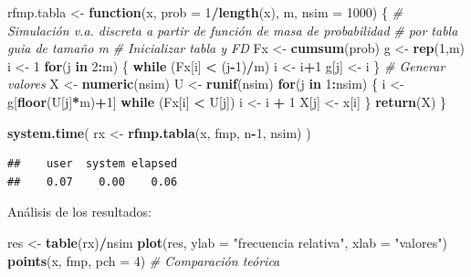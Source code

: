 \documentclass[]{book}
\newenvironment{Shaded}{\begin{snugshade}}{\end{snugshade}}
\newcommand{\KeywordTok}[1]{\textcolor[rgb]{0.13,0.29,0.53}{\textbf{#1}}}
\newcommand{\DataTypeTok}[1]{\textcolor[rgb]{0.13,0.29,0.53}{#1}}
\newcommand{\DecValTok}[1]{\textcolor[rgb]{0.00,0.00,0.81}{#1}}
\newcommand{\StringTok}[1]{\textcolor[rgb]{0.31,0.60,0.02}{#1}}
\newcommand{\CommentTok}[1]{\textcolor[rgb]{0.56,0.35,0.01}{\textit{#1}}}
\newcommand{\ControlFlowTok}[1]{\textcolor[rgb]{0.13,0.29,0.53}{\textbf{#1}}}
\newcommand{\OperatorTok}[1]{\textcolor[rgb]{0.81,0.36,0.00}{\textbf{#1}}}
\newcommand{\NormalTok}[1]{#1}
\theoremstyle{definition}
\theoremstyle{definition}
\theoremstyle{definition}
\theoremstyle{remark}
\begin{document}
\begin{Shaded}
\begin{Highlighting}[]
\NormalTok{rfmp.tabla <-}\StringTok{ }\ControlFlowTok{function}\NormalTok{(x, }\DataTypeTok{prob =} \DecValTok{1}\OperatorTok{/}\KeywordTok{length}\NormalTok{(x), m, }\DataTypeTok{nsim =} \DecValTok{1000}\NormalTok{) \{}
  \CommentTok{# Simulación v.a. discreta a partir de función de masa de probabilidad}
  \CommentTok{# por tabla guia de tamaño m}
  \CommentTok{# Inicializar tabla y FD}
\NormalTok{  Fx <-}\StringTok{ }\KeywordTok{cumsum}\NormalTok{(prob)}
\NormalTok{  g <-}\StringTok{ }\KeywordTok{rep}\NormalTok{(}\DecValTok{1}\NormalTok{,m)}
\NormalTok{  i <-}\StringTok{ }\DecValTok{1}
  \ControlFlowTok{for}\NormalTok{(j }\ControlFlowTok{in} \DecValTok{2}\OperatorTok{:}\NormalTok{m) \{}
    \ControlFlowTok{while}\NormalTok{ (Fx[i] }\OperatorTok{<}\StringTok{ }\NormalTok{(j}\OperatorTok{-}\DecValTok{1}\NormalTok{)}\OperatorTok{/}\NormalTok{m) i <-}\StringTok{ }\NormalTok{i}\OperatorTok{+}\DecValTok{1}
\NormalTok{    g[j] <-}\StringTok{ }\NormalTok{i}
\NormalTok{  \}}
  \CommentTok{# Generar valores}
\NormalTok{  X <-}\StringTok{ }\KeywordTok{numeric}\NormalTok{(nsim)}
\NormalTok{  U <-}\StringTok{ }\KeywordTok{runif}\NormalTok{(nsim)}
  \ControlFlowTok{for}\NormalTok{(j }\ControlFlowTok{in} \DecValTok{1}\OperatorTok{:}\NormalTok{nsim) \{}
\NormalTok{    i <-}\StringTok{ }\NormalTok{g[}\KeywordTok{floor}\NormalTok{(U[j]}\OperatorTok{*}\NormalTok{m)}\OperatorTok{+}\DecValTok{1}\NormalTok{]}
    \ControlFlowTok{while}\NormalTok{ (Fx[i] }\OperatorTok{<}\StringTok{ }\NormalTok{U[j]) i <-}\StringTok{ }\NormalTok{i }\OperatorTok{+}\StringTok{ }\DecValTok{1}
\NormalTok{    X[j] <-}\StringTok{ }\NormalTok{x[i]}
\NormalTok{  \}}
  \KeywordTok{return}\NormalTok{(X)}
\NormalTok{\}}

\KeywordTok{system.time}\NormalTok{( rx <-}\StringTok{ }\KeywordTok{rfmp.tabla}\NormalTok{(x, fmp, n}\OperatorTok{-}\DecValTok{1}\NormalTok{, nsim) )}
\end{Highlighting}
\end{Shaded}

\begin{verbatim}
##    user  system elapsed 
##    0.07    0.00    0.06
\end{verbatim}

Análisis de los resultados:

\begin{Shaded}
\begin{Highlighting}[]
\NormalTok{res <-}\StringTok{ }\KeywordTok{table}\NormalTok{(rx)}\OperatorTok{/}\NormalTok{nsim}
\KeywordTok{plot}\NormalTok{(res, }\DataTypeTok{ylab =} \StringTok{"frecuencia relativa"}\NormalTok{, }\DataTypeTok{xlab =} \StringTok{"valores"}\NormalTok{)}
\KeywordTok{points}\NormalTok{(x, fmp, }\DataTypeTok{pch =} \DecValTok{4}\NormalTok{)  }\CommentTok{# Comparación teórica}
\end{Highlighting}
\end{Shaded}
\end{document}
